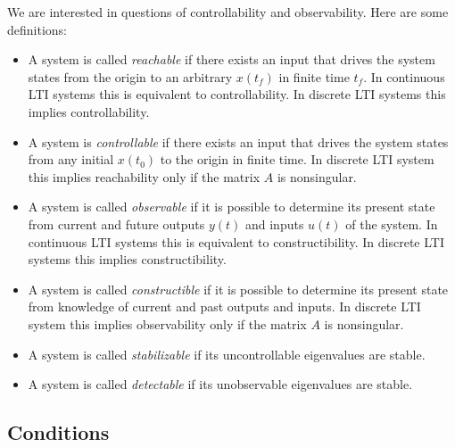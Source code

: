 \documentclass{report}
\begin{document}
We are interested in questions of controllability and
observability. Here are some definitions:
\begin{itemize}
  \item{
    A system is called \emph{reachable} if there exists an input that
    drives the system states from the origin to an arbitrary $x(t_f)$
    in finite time $t_f$. In continuous LTI systems this is
    equivalent to controllability. In discrete LTI systems this
    implies controllability.
  }
  \item{
    A system is \emph{controllable} if there exists an input that
    drives the system states from any initial $x(t_0)$ to the origin
    in finite time. In discrete LTI system this implies reachability
    only if the matrix $A$ is nonsingular.
  }
  \item{
    A system is called \emph{observable} if it is possible to
    determine its present state from current and future outputs $y(t)$
    and inputs $u(t)$ of the system. In continuous LTI systems this is
    equivalent to constructibility. In discrete LTI systems this
    implies constructibility.
  }
  \item{
    A system is called \emph{constructible} if it is possible to
    determine its present state from knowledge of current and past
    outputs and inputs. In discrete LTI system this implies
    observability only if the matrix $A$ is nonsingular.
  }
  \item{
    A system is called \emph{stabilizable} if its uncontrollable
    eigenvalues are stable.
  }
  \item{
    A system is called \emph{detectable} if its unobservable
    eigenvalues are stable.
  }
\end{itemize}

\subsection{Conditions}
\end{document}
